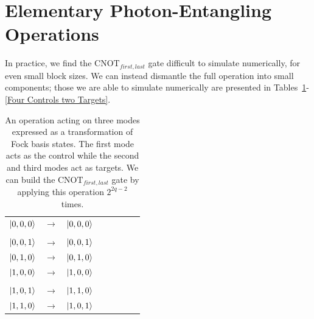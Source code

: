 \documentclass[aps,pra,twocolumn,showpacs,superscriptaddress,floatfix,10pt]{revtex4}
\begin{document}
\section{Elementary Photon-Entangling Operations}
\label{Section Elementary Photon Entangling Operations}
In practice, we find the $\mbox{CNOT}_{first,last}$ gate difficult to simulate numerically, for even small block sizes. We can instead dismantle the full operation into small components; those we are able to simulate numerically are presented in Tables~\ref{One Control Two Targets}-\ref{Four Controls two Targets}.
\begin {table}[h]
\begin{center}
	\begin{tabular}{l*{6}{c}r} 
		$\ket{0,0,0}$  &  $\rightarrow$ & $\ket{0,0,0}$ \\ \\
		$\ket{0,0,1}$  & $\rightarrow$ & $\ket{0,0,1}$ \\
		$\ket{0,1,0}$ & $\rightarrow$ & $\ket{0,1,0}$ \\
		$\ket{1,0,0}$ & $\rightarrow$ & $\ket{1,0,0} $ \\ \\
		$\ket{1,0,1}$ & $\rightarrow$ & $\ket{1,1,0}$ \\
		$\ket{1,1,0}$ & $\rightarrow$ & $\ket{1,0,1}$ \\
	\end{tabular}
	\caption{ \label{One Control Two Targets} An operation acting on three modes expressed as a transformation of Fock basis states. The first mode acts as the control while the second and third modes act as targets. We can build the $\mbox{CNOT}_{first,last}$ gate by applying this operation $2^{2 q -2}$ times.}
\end{center}
\end{table}
\end{document}

